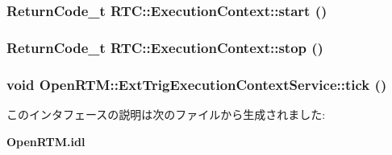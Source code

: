 \subsubsection[{start}]{\setlength{\rightskip}{0pt plus 5cm}ReturnCode\_\-t RTC::ExecutionContext::start ()\hspace{0.3cm}{\ttfamily  [inherited]}}\label{interfaceRTC_1_1ExecutionContext_ab015ee47c132e0cf223459d2db7b9f94}
\subsubsection[{stop}]{\setlength{\rightskip}{0pt plus 5cm}ReturnCode\_\-t RTC::ExecutionContext::stop ()\hspace{0.3cm}{\ttfamily  [inherited]}}\label{interfaceRTC_1_1ExecutionContext_afe216bae26d5817459a67e5b7e3134ce}
\subsubsection[{tick}]{\setlength{\rightskip}{0pt plus 5cm}void OpenRTM::ExtTrigExecutionContextService::tick ()}\label{interfaceOpenRTM_1_1ExtTrigExecutionContextService_a0a9227a44b63a0fc49fbc8ea9acc898d}


このインタフェースの説明は次のファイルから生成されました:\begin{DoxyCompactItemize}
\item 
{\bf OpenRTM.idl}\end{DoxyCompactItemize}
